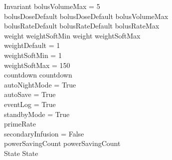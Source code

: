 \begin{schema}{Invariant}
	bolusVolumeMax = 5\\
	bolusDoseDefault  \land bolusDoseDefault \leq bolusVolumeMax\\
	bolusRateDefault  \land bolusRateDefault \leq bolusRateMax\\
	weight \geq weightSoftMin \land weight \leq weightSoftMax\\
	weightDefault = 1\\
	weightSoftMin = 1\\
	weightSoftMax = 150\\
	countdown  \land countdown \\
	autoNightMode = True\\
	autoSave = True\\
	eventLog = True\\
	standbyMode = True\\
	primeRate \\
	secondaryInfusion = False\\
	powerSavingCount  \land powerSavingCount \\
	State  \land State \\
\end{schema}

